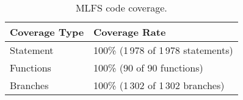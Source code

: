
\begin{table}[h]

\centering
\begin{tabular}{|l|l|}
\hline
\textbf{Coverage Type} & \textbf{Coverage Rate} \\
\hline
Statement     & 100\% (1\,978 of 1\,978 statements)\\
Functions     & 100\% (90 of 90 functions)\\
Branches      & 100\% (1\,302 of 1\,302 branches)\\
\hline
\end{tabular}
\caption{MLFS code coverage.}
\label{table:mlfs_coverage}

\end{table}